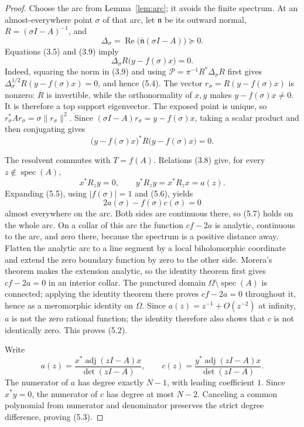 \documentclass[11pt]{article}
\theoremstyle{definition}
\theoremstyle{remark}
\newcommand{\spec}{\operatorname{spec}}
\newcommand{\adj}{\operatorname{adj}}
\newcommand{\Rea}{\operatorname{Re}}
\begin{document}
\begin{proof}
Choose the arc from Lemma~\ref{lem:arc}; it avoids the finite spectrum.  At an
almost-everywhere point \(\sigma\) of that arc, let \(\mathfrak n\) be its outward
normal, \(R=(\sigma I-A)^{-1}\), and
\[
 \Delta_\sigma=\Rea\bigl(\overline{\mathfrak n}(\sigma I-A)\bigr)\succeq0.
\]
Equations (3.5) and (3.9) imply
\[
 \Delta_\sigma R\bigl(y-f(\sigma)x\bigr)=0.           \tag{5.4}
\]
Indeed, squaring the norm in (3.9) and using
\(\mathcal P=\pi^{-1}R^*\Delta_\sigma R\) first gives
\(\Delta_\sigma^{1/2}R(y-f(\sigma)x)=0\), and hence (5.4).
The vector
\(r_\sigma=R(y-f(\sigma)x)\) is nonzero: \(R\) is invertible, while the
orthonormality of \(x,y\) makes \(y-f(\sigma)x\neq0\).  It is therefore a top
support eigenvector.  The exposed point is unique, so
\(r_\sigma^*Ar_\sigma=\sigma\|r_\sigma\|^2\).  Since
\((\sigma I-A)r_\sigma=y-f(\sigma)x\), taking a scalar product and then conjugating
gives
\[
 \bigl(y-f(\sigma)x\bigr)^*
 R\bigl(y-f(\sigma)x\bigr)=0.                         \tag{5.5}
\]

The resolvent commutes with \(T=f(A)\).  Relations (3.8) give, for every
\(z\notin\spec(A)\),
\[
 x^*R_z y=0,\qquad y^*R_z y=x^*R_zx=a(z).             \tag{5.6}
\]
Expanding (5.5), using \(|f(\sigma)|=1\) and (5.6), yields
\[
 2a(\sigma)-f(\sigma)c(\sigma)=0                     \tag{5.7}
\]
almost everywhere on the arc.  Both sides are continuous there, so (5.7)
holds on the whole arc.  On a collar of this arc the function \(cf-2a\) is
analytic, continuous to the arc, and zero there, because the spectrum is a
positive distance away.  Flatten the analytic arc to a line segment by a
local biholomorphic coordinate and extend the zero boundary function by zero
to the other side.  Morera's theorem makes the extension analytic, so the
identity theorem first gives \(cf-2a=0\) in an interior collar.  The punctured
domain \(\Omega\setminus\spec(A)\) is connected; applying the identity theorem
there proves \(cf-2a=0\) throughout it, hence as a meromorphic identity on
\(\Omega\).  Since \(a(z)=z^{-1}+O(z^{-2})\) at infinity, \(a\) is not the
zero rational function; the identity therefore also shows that \(c\) is not
identically zero.  This proves (5.2).

Write
\[
 a(z)=\frac{x^*\adj(zI-A)x}{\det(zI-A)},\qquad
 c(z)=\frac{y^*\adj(zI-A)x}{\det(zI-A)}.
\]
The numerator of \(a\) has degree exactly \(N-1\), with leading coefficient
\(1\).  Since \(x^*y=0\), the numerator of \(c\) has degree at most \(N-2\).
Canceling a common polynomial from numerator and denominator preserves the
strict degree difference, proving (5.3).
\end{proof}
\end{document}
